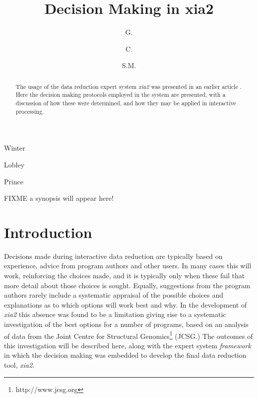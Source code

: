 \documentclass[preprint,pdf]{iucr}
\begin{document}
\title{Decision Making in xia2}

\author[a]{G.}{Winter}
\author[a]{C.}{Lobley}
\author[b]{S.M.}{Prince}


\maketitle
\clearpage

\begin{synopsis}
FIXME a synopsis will appear here!
\end{synopsis}

\begin{abstract}

The usage of the data reduction expert system \emph{xia2} was
presented in an earlier article \cite{Winter:ea5113}. Here the decision making
protocols employed in the system are presented, with a discussion
of how these were determined, and how they may be applied in interactive
processing. 

\end{abstract}

\section{Introduction}

Decisions made during interactive data reduction are typically based
on experience, advice from program authors and other users. In many
cases this will work, reinforcing the choices made, and it is typically
only when these fail that more detail about those choices is
sought. Equally, suggestions from the program authors rarely include a
systematic appraisal of the possible choices and explanations as to
which options will work best and why. 
In the development of \emph{xia2} this absence was found
to be a limitation giving rise to a systematic investigation of the best
options for a number of programs, 
based on an analysis of data from the Joint Centre
for Structural Genomics\footnote{http://www.jcsg.org} (JCSG.) The
outcomes of this investigation will be described here, along with the
expert system \emph{framework} in which the decision making was
embedded to develop the final data reduction tool, \emph{xia2}.
\end{document}
